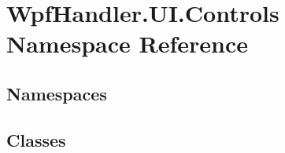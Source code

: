 \hypertarget{namespace_wpf_handler_1_1_u_i_1_1_controls}{}\section{Wpf\+Handler.\+U\+I.\+Controls Namespace Reference}
\label{namespace_wpf_handler_1_1_u_i_1_1_controls}
\subsection*{Namespaces}
\begin{DoxyCompactItemize}
\end{DoxyCompactItemize}
\subsection*{Classes}
